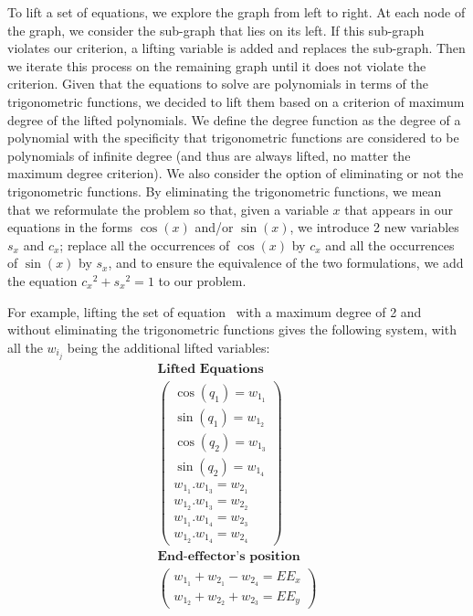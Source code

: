 To lift a set of equations, we explore the graph from left to right.
At each node of the graph, we consider the sub-graph that lies on its left.
If this sub-graph violates our criterion, a lifting variable is added and replaces the sub-graph.
Then we iterate this process on the remaining graph until it does not violate the criterion.
Given that the equations to solve are polynomials in terms of the trigonometric functions, we decided to lift them based on a criterion of maximum degree of the lifted polynomials.
We define the degree function as the degree of a polynomial with the specificity that trigonometric functions are considered to be polynomials of infinite degree (and thus are always lifted, no matter the maximum degree criterion).
We also consider the option of eliminating or not the trigonometric functions.
By eliminating the trigonometric functions, we mean that we reformulate the problem so that, given a variable $x$ that appears in our equations in the forms $\cos(x)$ and/or $\sin(x)$, we introduce 2 new variables $s_x$ and $c_x$; replace all the occurrences of $\cos(x)$ by $c_x$ and all the occurrences of $\sin(x)$ by $s_x$, and to ensure the equivalence of the two formulations, we add the equation ${c_x}^2 + {s_x}^2=1$ to our problem.

For example, lifting the set of equation~ with a maximum degree of 2 and without eliminating the trigonometric functions gives the following system, with all the $w_{i_j}$ being the additional lifted variables:
\begin{equation}
  \begin{array}{c}
  \textbf{Lifted Equations}\\
  \left(
    \begin{array}{c}
      \cos(q_1) = w_{1_1}\\
      \sin(q_1) = w_{1_2}\\
      \cos(q_2) = w_{1_3}\\
      \sin(q_2) = w_{1_4}\\
      w_{1_1}.w_{1_3} = w_{2_1}\\
      w_{1_2}.w_{1_3} = w_{2_2}\\
      w_{1_1}.w_{1_4} = w_{2_3}\\
      w_{1_2}.w_{1_4} = w_{2_4}
    \end{array}
  \right)\\
  \textbf{End-effector's position}\\
  \left(\begin{array}{c}
      w_{1_1} + w_{2_1} - w_{2_4} = EE_x\\
      w_{1_2} + w_{2_2} + w_{2_3} = EE_y
    \end{array}
  \right)\\
  \end{array}
\end{equation}
\label{eq:lifted_equations}

